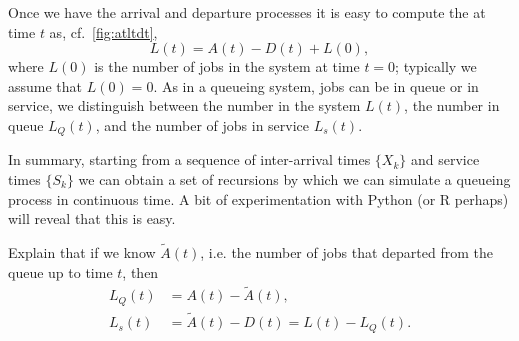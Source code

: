 Once we have the arrival and departure processes it is easy to compute the  at time $t$ as, cf.~\cref{fig:atltdt},
\begin{equation}\label{eq:14}
 L(t) = A(t) - D(t) + L(0),
\end{equation}
where $L(0)$ is the number of jobs in the system at time $t=0$; typically we assume that $L(0)=0$.
As in a queueing system, jobs can be in queue or in service, we distinguish between the number in the system $L(t)$, the number in queue $L_Q(t)$, and the number of jobs in service $L_s(t)$.


In summary, starting from a sequence of inter-arrival times $\{X_k\}$ and service times $\{S_k\}$ we can obtain a set of recursions by which we can simulate a queueing process in continuous time. A bit of experimentation with Python (or R perhaps) will reveal that this is easy.

\begin{extra}
 Explain that if we know $\tilde A(t)$, i.e.
 the number of jobs that departed from the queue up to time $t$, then
\begin{align*}
 L_Q(t) &= A(t) - \tilde A(t), \\
L_s(t) &= \tilde A(t) - D(t) = L(t) - L_Q(t).
\end{align*}
\begin{equation*}
\end{equation*}
\end{extra}



